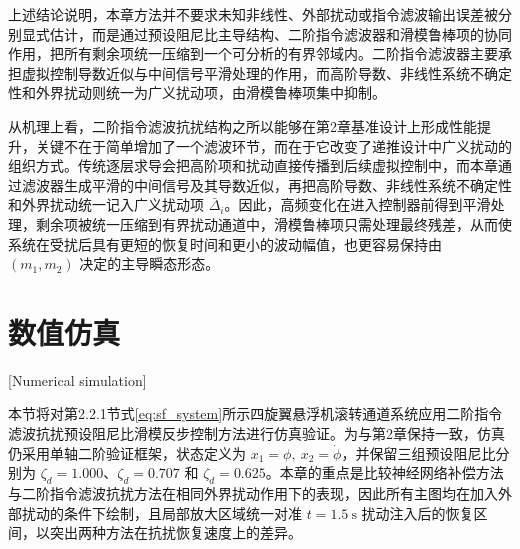 上述结论说明，本章方法并不要求未知非线性、外部扰动或指令滤波输出误差被分别显式估计，而是通过预设阻尼比主导结构、二阶指令滤波器和滑模鲁棒项的协同作用，把所有剩余项统一压缩到一个可分析的有界邻域内。二阶指令滤波器主要承担虚拟控制导数近似与中间信号平滑处理的作用，而高阶导数、非线性系统不确定性和外界扰动则统一为广义扰动项，由滑模鲁棒项集中抑制。

从机理上看，二阶指令滤波抗扰结构之所以能够在第2章基准设计上形成性能提升，关键不在于简单增加了一个滤波环节，而在于它改变了递推设计中广义扰动的组织方式。传统逐层求导会把高阶项和扰动直接传播到后续虚拟控制中，而本章通过滤波器生成平滑的中间信号及其导数近似，再把高阶导数、非线性系统不确定性和外界扰动统一记入广义扰动项 $\bar\Delta_i$。因此，高频变化在进入控制器前得到平滑处理，剩余项被统一压缩到有界扰动通道中，滑模鲁棒项只需处理最终残差，从而使系统在受扰后具有更短的恢复时间和更小的波动幅值，也更容易保持由 $(m_1,m_2)$ 决定的主导瞬态形态。

\section{数值仿真}[Numerical simulation]

本节将对第2.2.1节式\eqref{eq:sf_system}所示四旋翼悬浮机滚转通道系统应用二阶指令滤波抗扰预设阻尼比滑模反步控制方法进行仿真验证。为与第2章保持一致，仿真仍采用单轴二阶验证框架，状态定义为 $x_1=\phi,\ x_2=\dot\phi$，并保留三组预设阻尼比分别为 $\zeta_d=1.000$、$\zeta_d=0.707$ 和 $\zeta_d=0.625$。本章的重点是比较神经网络补偿方法与二阶指令滤波抗扰方法在相同外界扰动作用下的表现，因此所有主图均在加入外部扰动的条件下绘制，且局部放大区域统一对准 $t=1.5\ \mathrm{s}$ 扰动注入后的恢复区间，以突出两种方法在抗扰恢复速度上的差异。

